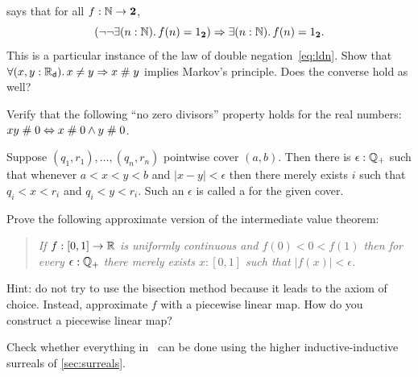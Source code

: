 %

\begin{ex} \label{ex:reals-apart-neq-MP}
  says that for all $f : \mathbb{N} \to \mathbf{2}$,
  \begin{equation*}
    (\lnot \lnot \exis{n : \nat} f(n) = \btrue)
    \Rightarrow
    \exis{n : \nat} f(n) = \btrue.
  \end{equation*}
  This is a particular instance of the law of double negation~\eqref{eq:ldn}. Show that
  $\fall{x, y: \RD} x \neq y \Rightarrow x \apart y$ implies Markov's principle. Does the
  converse hold as well?
\end{ex}

\begin{ex} \label{ex:reals-apart-zero-divisors}
  Verify that the following ``no zero divisors'' property holds for the real numbers:
  $x y \mathrel{\#} 0 \Leftrightarrow x \mathrel{\#} 0 \land y \mathrel{\#} 0$.
\end{ex}

\begin{ex} \label{ex:finite-cover-lebesgue-number}
  Suppose $(q_1, r_1), \ldots, (q_n, r_n)$ pointwise cover $(a, b)$. Then there is
  $\epsilon : \mathbb{Q}_{+}$ such that whenever $a < x < y < b$ and $|x - y| < \epsilon$
  then there merely exists $i$ such that $q_i < x < r_i$ and $q_i < y < r_i$. Such an
  $\epsilon$ is called a 
  for the given cover.
\end{ex}

\begin{ex} \label{ex:mean-value-theorem}
  Prove the following approximate version of the intermediate value theorem:
  \begin{quote}
    \emph{
      If $f : [0,1] \to \mathbb{R}$ is uniformly continuous and $f(0) < 0 < f(1)$ then
      for every $\epsilon : \mathbb{Q}_{+}$ there merely exists $x : [0,1]$ such that $|f(x)| <
      \epsilon$.
    }
  \end{quote}
  Hint: do not try to use the bisection method because it leads to the axiom of choice.
  Instead, approximate $f$ with a piecewise linear map. How do you construct a piecewise
  linear map?
\end{ex}

\begin{ex}\label{ex:knuth-surreal-check}
  Check whether everything in~\cite{knuth74:_surreal_number} can be done using the higher
  inductive-inductive surreals of \cref{sec:surreals}.
\end{ex}

